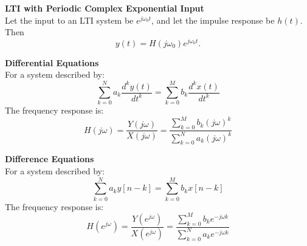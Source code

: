 \documentclass{article}
\begin{document}
\begin{multicols}{2}
    \noindent\textbf{LTI with Periodic Complex Exponential Input} \\
    Let the input to an LTI system be $e^{j\omega_0 t}$, and let the
    impulse response be $h(t)$. Then
    \[
        y(t) = H(j\omega_0)e^{j\omega_0 t}.
    \]

    \noindent\textbf{Differential Equations} \\
    For a system described by:
    \[
        \sum_{k=0}^{N} a_k \frac{d^k y(t)}{dt^k} = \sum_{k=0}^{M} b_k \frac{d^k x(t)}{dt^k}
    \]
    The frequency response is:
    \[ \label{eq:diff_eq_Hjw}
        H(j\omega) = \frac{Y(j\omega)}{X(j\omega)} = \frac{\sum_{k=0}^{M} b_k (j\omega)^k}{\sum_{k=0}^{N} a_k (j\omega)^k}
    \]

    \noindent\textbf{Difference Equations} \\
    For a system described by:
    \[
        \sum_{k=0}^{N} a_k y[n-k] = \sum_{k=0}^{M} b_k x[n-k]
    \]
    The frequency response is:
    \[ \label{eq:diff_eq_Hejomega}
        H(e^{j\omega}) = \frac{Y(e^{j\omega})}{X(e^{j\omega})} = \frac{\sum_{k=0}^{M} b_k e^{-j\omega k}}{\sum_{k=0}^{N} a_k e^{-j\omega k}}
    \]


\end{multicols}
\end{document}
